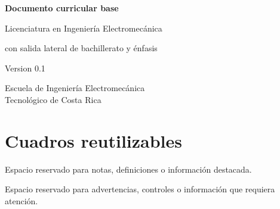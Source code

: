 \documentclass[11pt,letterpaper]{article}
\begin{document}
\begin{titlepage}
  \centering
  \vspace*{2.2cm}
  {\sffamily\bfseries\color{azulTEC}\fontsize{28}{33}\selectfont
  Documento curricular base\par}
  \vspace{0.8cm}
  {\sffamily\Large Licenciatura en Ingeniería Electromecánica\par}
  \vspace{0.3cm}
  {\sffamily\large con salida lateral de bachillerato y énfasis\par}
  \vspace{1.5cm}
  \begin{tcolorbox}[colback=azulClaro,colframe=azulTEC,width=.82\textwidth,arc=2mm]
    \centering
    Version 0.1\\
  \end{tcolorbox}
  \vfill
  {\sffamily Escuela de Ingeniería Electromecánica\\
  Tecnológico de Costa Rica\par}
\end{titlepage}

\section*{Cuadros reutilizables}

\begin{cuadroazul}
Espacio reservado para notas, definiciones o información destacada.
\end{cuadroazul}

\vspace{0.8cm}

\begin{cuadrocafe}
Espacio reservado para advertencias, controles o información que requiera atención.
\end{cuadrocafe}

\clearpage

\end{document}
